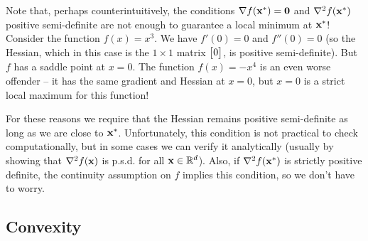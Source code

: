 Note that, perhaps counterintuitively, the conditions $\nabla f(\mathbf{x}^*) = \mathbf{0}$ and $\nabla^2 f(\mathbf{x}^*)$ positive semi-definite are not enough to guarantee a local minimum at $\mathbf{x}^*$!
Consider the function $f(x) = x^3$.
We have $f'(0) = 0$ and $f''(0) = 0$ (so the Hessian, which in this case is the $1 \times 1$ matrix $\begin{bmatrix}0\end{bmatrix}$, is positive semi-definite).
But $f$ has a saddle point at $x = 0$.
The function $f(x) = -x^4$ is an even worse offender -- it has the same gradient and Hessian at $x = 0$, but $x = 0$ is a strict local maximum for this function!

For these reasons we require that the Hessian remains positive semi-definite as long as we are close to $\mathbf{x}^*$.
Unfortunately, this condition is not practical to check computationally, but in some cases we can verify it analytically (usually by showing that $\nabla^2 f(\mathbf{x})$ is p.s.d. for all $\mathbf{x} \in \mathbb{R}^d$).
Also, if $\nabla^2 f(\mathbf{x}^*)$ is strictly positive definite, the continuity assumption on $f$ implies this condition, so we don't have to worry.

\subsection{Convexity}

